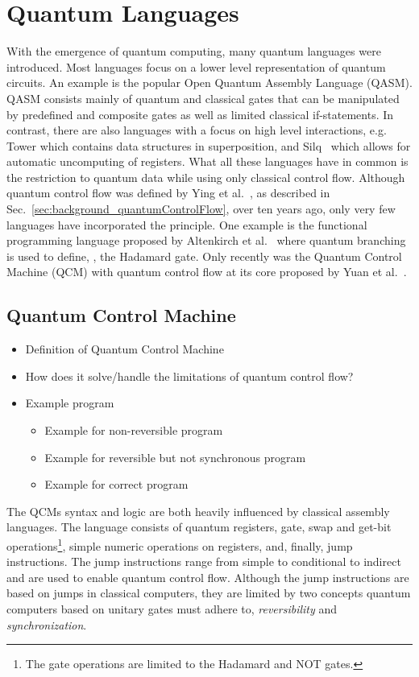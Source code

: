 \section{Quantum Languages}
With the emergence of quantum computing, many quantum languages were introduced. Most languages focus on a lower level representation of quantum circuits. An example is the popular Open Quantum Assembly Language (QASM)\cite{CBSG17}. QASM consists mainly of quantum and classical gates that can be manipulated by predefined and composite gates as well as limited classical if-statements. In contrast, there are also languages with a focus on high level interactions, e.g. Tower\cite{ChMi22} which contains data structures in superposition, and Silq~\cite{BBGV20} which allows for automatic uncomputing of registers. What all these languages have in common is the restriction to quantum data while using only classical control flow. Although quantum control flow was defined by Ying et al.~\cite{YYF12}, as described in Sec.~\ref{sec:background_quantumControlFlow}, over ten years ago, only very few languages have incorporated the principle. One example is the functional programming language proposed by Altenkirch et al.~\cite{AlGr05} where quantum branching is used to define, \eg, the Hadamard gate. Only recently was the Quantum Control Machine (QCM) with quantum control flow at its core proposed by Yuan et al.~\cite{YVC24}. 

\subsection{Quantum Control Machine}
\begin{itemize}
    \item Definition of Quantum Control Machine
    \item How does it solve/handle the limitations of quantum control flow?
    \item Example program
    \begin{itemize}
        \item Example for non-reversible program
        \item Example for reversible but not synchronous program
        \item Example for correct program
    \end{itemize}
\end{itemize}
The QCMs syntax and logic are both heavily influenced by classical assembly languages. The language consists of quantum registers, gate, swap and get-bit operations\footnote{The gate operations are limited to the Hadamard and NOT gates.}, simple numeric operations on registers, and, finally, jump instructions. The jump instructions range from simple to conditional to indirect and are used to enable quantum control flow. Although the jump instructions are based on jumps in classical computers, they are limited by two concepts quantum computers based on unitary gates must adhere to, \emph{reversibility} and \emph{synchronization}.~\cite{YVC24}

